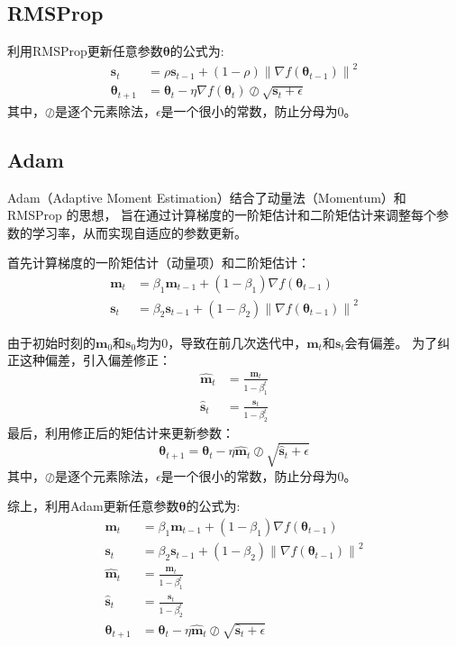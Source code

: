 \documentclass[withoutpreface,bwprint]{NoteBook}
\begin{document}
\subsection{RMSProp}

利用RMSProp更新任意参数$\bm{\theta}$的公式为:
\begin{align}
    \label{eq:RMSProp的参数更新公式}
    \mathbf{s}_{t} &= \rho \mathbf{s}_{t-1} + (1-\rho) \left\| \nabla f (\bm{\theta}_{t-1}) \right\| ^2 \\
    \bm{\theta}_{t+1} &=  \bm{\theta}_t - \eta \nabla f (\bm{\theta}_t) \oslash  \sqrt{\mathbf{s}_{t} + \epsilon}
\end{align}
其中，$ \oslash $是逐个元素除法，$\epsilon$是一个很小的常数，防止分母为0。

\subsection{Adam}
Adam（Adaptive Moment Estimation）结合了动量法（Momentum）和 RMSProp 的思想，
旨在通过计算梯度的一阶矩估计和二阶矩估计来调整每个参数的学习率，从而实现自适应的参数更新。

首先计算梯度的一阶矩估计（动量项）和二阶矩估计：
\begin{align}
    \mathbf{m}_{t} &= \beta_1 \mathbf{m}_{t-1} + (1-\beta_1) \nabla f (\bm{\theta}_{t-1}) \\
    \mathbf{s}_{t} &= \beta_2 \mathbf{s}_{t-1} + (1-\beta_2) \left\| \nabla f (\bm{\theta}_{t-1}) \right\| ^2
\end{align}

由于初始时刻的$\mathbf{m}_0$和$\mathbf{s}_0$均为0，导致在前几次迭代中，$\mathbf{m}_t$和$\mathbf{s}_t$会有偏差。
为了纠正这种偏差，引入偏差修正：
\begin{align}
    \hat{\mathbf{m}}_{t} &= \frac{\mathbf{m}_{t}}{1-\beta_1^t} \\
    \hat{\mathbf{s}}_{t} &= \frac{\mathbf{s}_{t}}{1-\beta_2^t}
\end{align}
最后，利用修正后的矩估计来更新参数：
\begin{equation}
    \bm{\theta}_{t+1} =  \bm{\theta}_t - \eta \hat{\mathbf{m}}_{t} \oslash  \sqrt{\hat{\mathbf{s}}_{t} + \epsilon}
\end{equation}
其中，$ \oslash $是逐个元素除法，$\epsilon$是一个很小的常数，防止分母为0。

综上，利用Adam更新任意参数$\bm{\theta}$的公式为:
\begin{align}
    \label{eq:Adam的参数更新公式}
    \mathbf{m}_{t} &= \beta_1 \mathbf{m}_{t-1} + (1-\beta_1) \nabla f (\bm{\theta}_{t-1}) \\
    \mathbf{s}_{t} &= \beta_2 \mathbf{s}_{t-1} + (1-\beta_2) \left\| \nabla f (\bm{\theta}_{t-1}) \right\| ^2 \\
    \hat{\mathbf{m}}_{t} &= \frac{\mathbf{m}_{t}}{1-\beta_1^t} \\
    \hat{\mathbf{s}}_{t} &= \frac{\mathbf{s}_{t}}{1-\beta_2^t} \\
    \bm{\theta}_{t+1} &=  \bm{\theta}_t - \eta \hat{\mathbf{m}}_{t} \oslash  \sqrt{\hat{\mathbf{s}}_{t} + \epsilon}
\end{align}
\end{document}
